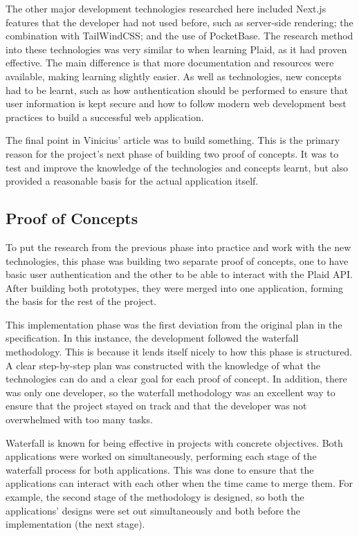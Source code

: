 The other major development technologies researched here included Next.js features that the developer had not used before, such as server-side rendering; the combination with TailWindCSS; and the use of PocketBase. The research method into these technologies was very similar to when learning Plaid, as it had proven effective. The main difference is that more documentation and resources were available, making learning slightly easier. As well as technologies, new concepts had to be learnt, such as how authentication should be performed to ensure that user information is kept secure and how to follow modern web development best practices to build a successful web application.

The final point in Vinicius' article was to build something. This is the primary reason for the project's next phase of building two proof of concepts. It was to test and improve the knowledge of the technologies and concepts learnt, but also provided a reasonable basis for the actual application itself.

\subsection{Proof of Concepts}
To put the research from the previous phase into practice and work with the new technologies, this phase was building two separate proof of concepts, one to have basic user authentication and the other to be able to interact with the Plaid API. After building both prototypes, they were merged into one application, forming the basis for the rest of the project.

This implementation phase was the first deviation from the original plan in the specification. In this instance, the development followed the waterfall methodology. This is because it lends itself nicely to how this phase is structured. A clear step-by-step plan was constructed with the knowledge of what the technologies can do and a clear goal for each proof of concept. In addition, there was only one developer, so the waterfall methodology was an excellent way to ensure that the project stayed on track and that the developer was not overwhelmed with too many tasks.

Waterfall is known for being effective in projects with concrete objectives. Both applications were worked on simultaneously, performing each stage of the waterfall process for both applications. This was done to ensure that the applications can interact with each other when the time came to merge them. For example, the second stage of the methodology is designed, so both the applications' designs were set out simultaneously and both before the implementation (the next stage).


